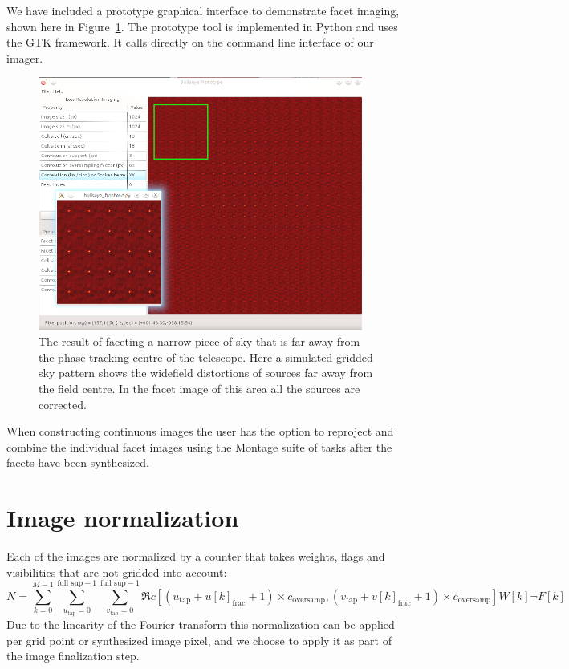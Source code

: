 We have included a prototype graphical interface to demonstrate facet imaging, shown here in Figure~\ref{FIG_TARGETED_FACETING}. The prototype tool is implemented in Python and uses the GTK
framework. It calls directly on the command line interface of our imager.
\begin{figure}[ht!]
 \begin{mdframed}
  \centering
  \includegraphics[width=0.95\textwidth]{images/targeted_faceting.png}
  \caption[Targeted faceting in action]{The result of faceting a narrow piece of sky that is far away from the phase tracking centre of the telescope. Here a simulated gridded sky pattern
  shows the widefield distortions of sources far away from the field centre. In the facet image of this area all the sources are corrected.}
  \label{FIG_TARGETED_FACETING}
 \end{mdframed}
\end{figure}

When constructing continuous images the user has the option to reproject and combine the individual facet images using the Montage \cite{jacob2004montage} suite of tasks after the facets have been
synthesized.

\section{Image normalization}
Each of the images are normalized by a counter that takes weights, flags and visibilities that are not gridded into account:
\begin{equation}
 N = \sum_{k=0}^{M-1}{\sum_{u_\text{tap}=0}^{\text{full sup}-1}{\sum_{v_\text{tap}=0}^{\text{full sup}-1}{\Re{c[(u_\text{tap}+u[k]_\text{frac} + 1)\times c_\text{oversamp},(v_\text{tap}+v[k]_\text{frac} + 1)\times c_\text{oversamp}]}}} W[k]\neg F[k]}
\end{equation}
Due to the linearity of the Fourier transform this normalization can be applied per grid point or synthesized image pixel, and we choose to apply it as part of the image finalization step. 

